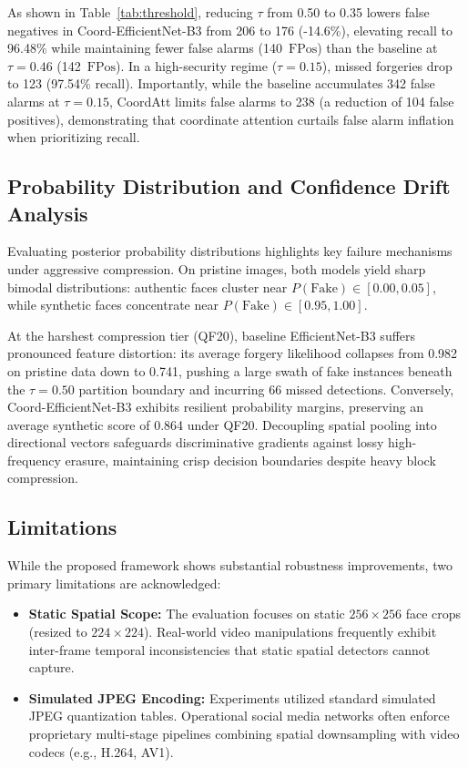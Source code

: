 \documentclass[conference]{IEEEtran}
\begin{document}
As shown in Table~\ref{tab:threshold}, reducing $\tau$ from 0.50 to 0.35 lowers false negatives in Coord-EfficientNet-B3 from 206 to 176 (-14.6\%), elevating recall to 96.48\% while maintaining fewer false alarms (140~$\text{FPos}$) than the baseline at $\tau = 0.46$ (142~$\text{FPos}$). In a high-security regime ($\tau = 0.15$), missed forgeries drop to 123 (97.54\% recall). Importantly, while the baseline accumulates 342 false alarms at $\tau = 0.15$, CoordAtt limits false alarms to 238 (a reduction of 104 false positives), demonstrating that coordinate attention curtails false alarm inflation when prioritizing recall.

\subsection{Probability Distribution and Confidence Drift Analysis}
Evaluating posterior probability distributions highlights key failure mechanisms under aggressive compression. On pristine images, both models yield sharp bimodal distributions: authentic faces cluster near $P(\text{Fake}) \in [0.00, 0.05]$, while synthetic faces concentrate near $P(\text{Fake}) \in [0.95, 1.00]$.

At the harshest compression tier (QF20), baseline EfficientNet-B3 suffers pronounced feature distortion: its average forgery likelihood collapses from 0.982 on pristine data down to 0.741, pushing a large swath of fake instances beneath the $\tau = 0.50$ partition boundary and incurring 66 missed detections. Conversely, Coord-EfficientNet-B3 exhibits resilient probability margins, preserving an average synthetic score of 0.864 under QF20. Decoupling spatial pooling into directional vectors safeguards discriminative gradients against lossy high-frequency erasure, maintaining crisp decision boundaries despite heavy block compression.

\subsection{Limitations}
While the proposed framework shows substantial robustness improvements, two primary limitations are acknowledged:
\begin{itemize}
    \item \textbf{Static Spatial Scope:} The evaluation focuses on static $256 \times 256$ face crops (resized to $224 \times 224$). Real-world video manipulations frequently exhibit inter-frame temporal inconsistencies that static spatial detectors cannot capture.
    \item \textbf{Simulated JPEG Encoding:} Experiments utilized standard simulated JPEG quantization tables. Operational social media networks often enforce proprietary multi-stage pipelines combining spatial downsampling with video codecs (e.g., H.264, AV1).
\end{itemize}
\end{document}

